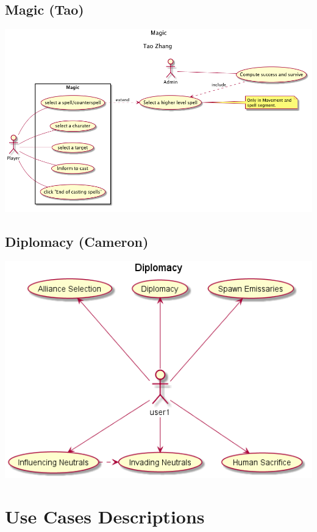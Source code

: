 \documentclass[12pt,letterpaper]{scrreprt}
\begin{document}
\section{Magic (Tao)}
\includegraphics[scale=0.4]{MagicDiagram.png}
\section{Diplomacy (Cameron)}
\includegraphics[scale=0.6]{DiplomacyUseCaseDiagram.png}


\chapter{Use Cases Descriptions}

\end{document}
